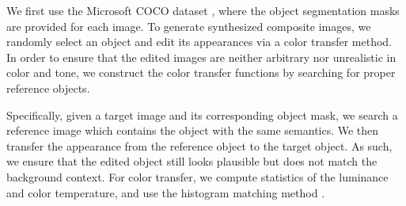 \documentclass[10pt,twocolumn,letterpaper]{article}
\begin{document}
%
%
{}
%
We first use the Microsoft COCO dataset \cite{Lin_ECCV_2014}, 
where the object segmentation masks are provided for each image.
%
To generate synthesized composite images, we randomly select an object and edit its appearances via a color transfer method.
%
In order to ensure that the edited images are neither arbitrary nor unrealistic in 
color and tone, 
we construct the color transfer functions by searching for proper reference objects.
%

Specifically, given a target image and its corresponding object mask, we search a reference image which contains the object with the same semantics.
%
We then transfer the appearance from the reference object to the target object.
%
As such, we ensure that the edited object still looks plausible but does not match the background context.
%
For color transfer, we compute statistics of the luminance and color temperature, 
and use the histogram matching method  \cite{Lee_CVPR_2016}. 
\end{document}
